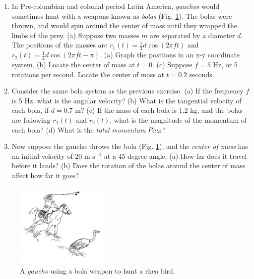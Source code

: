\documentclass{article}
\begin{document}
\begin{enumerate}
\item In Pre-columbian and colonial period Latin America, \textit{gauchos} would sometimes hunt with a weapons known as \textit{bolas} (Fig. \ref{fig:1}).  The bolas were thrown, and would spin around the center of mass until they wrapped the limbs of the prey. (a) Suppose two masses $m$ are separated by a diameter $d$.  The positions of the masses are $r_1(t) = \frac{1}{2}d\cos(2\pi f t)$ and $r_2(t) = \frac{1}{2}d\cos(2\pi f t-\pi)$.  (a) Graph the positions in an x-y coordinate system.  (b) Locate the center of mass at $t = 0$. (c) Suppose $f = 5$ Hz, or 5 rotations per second.  Locate the center of mass at $t=0.2$ seconds. \\ \vspace{3cm}
\item Consider the same bola system as the previous exercise.  (a) If the frequency $f$ is 5 Hz, what is the angular velocity? (b) What is the tangential velocity of each bola, if $d = 0.7$ m?  (c) If the mass of each bola is 1.2 kg, and the bolas are following $r_1(t)$ and $r_2(t)$, what is the magnitude of the momentum of each bola?  (d) What is the \textit{total momentum} $P_{\rm CM}$? \\ \vspace{2cm}
\item Now suppose the gaucho throws the bola (Fig. \ref{fig:1}), and the \textit{center of mass} has an initial velocity of 20 m s$^{-1}$ at a 45 degree angle.  (a) How far does it travel before it lands?  (b) Does the rotation of the bolas around the center of mass affect how far it goes? \\ \vspace{2cm}
\end{enumerate}

\begin{figure}[hb]
\centering
\includegraphics[width=0.4\textwidth]{figures/Bola.jpg}
\caption{\label{fig:1} A \textit{gaucho} using a bola weapon to hunt a rhea bird.}
\end{figure}
\end{document}
